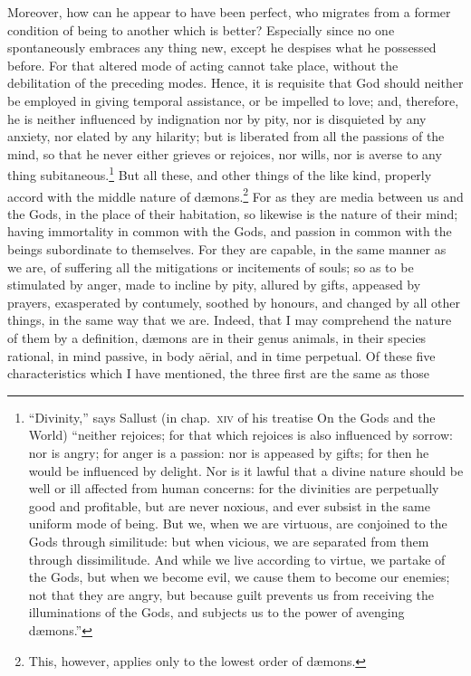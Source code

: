 \documentclass[12pt]{article}
\begin{document}
Moreover, how can he appear to have been perfect, who migrates from a former
condition of being to another which is better? Especially since no one
spontaneously embraces any thing new, except he despises what he possessed
before. For that altered mode of acting cannot take place, without the
debilitation of the preceding modes. Hence, it is requisite that God should
neither be employed in giving temporal assistance, or be impelled to love; and,
therefore, he is neither influenced by indignation nor by pity, nor is
disquieted by any anxiety, nor elated by any hilarity; but is liberated from
all the passions of the mind, so that he never either grieves or rejoices, nor
wills, nor is averse to any thing subitaneous.\footnote{``Divinity,'' says
Sallust (in chap.~\textsc{xiv} of his treatise On the Gods and the World)
``neither rejoices; for that which rejoices is also influenced by sorrow: nor
is angry; for anger is a passion: nor is appeased by gifts; for then he would
be influenced by delight. Nor is it lawful that a divine nature should be well
or ill affected from human concerns: for the divinities are perpetually good
and profitable, but are never noxious, and ever subsist in the same uniform
mode of being. But we, when we are virtuous, are conjoined to the Gods through
similitude: but when vicious, we are separated from them through dissimilitude.
And while we live according to virtue, we partake of the Gods, but when we
become evil, we cause them to become our enemies; not that they are angry, but
because guilt prevents us from receiving the illuminations of the Gods, and
subjects us to the power of avenging d{\ae}mons.''} But all these, and other
things of the like kind, properly accord with the middle nature of
d{\ae}mons.\footnote{This, however, applies only to the lowest order of
d{\ae}mons.} For as they are media between us and the Gods, in the place of
their habitation, so likewise is the nature of their mind; having immortality
in common with the Gods, and passion in common with the beings subordinate to
themselves.  For they are capable, in the same manner as we are, of suffering
all the mitigations or incitements of souls; so as to be stimulated by anger,
made to incline by pity, allured by gifts, appeased by prayers, exasperated by
contumely, soothed by honours, and changed by all other things, in the same way
that we are. Indeed, that I may comprehend the nature of them by a definition,
d{\ae}mons are in their genus animals, in their species rational, in mind
passive, in body a\"{e}rial, and in time perpetual. Of these five
characteristics which I have mentioned, the three first are the same as those
\end{document}

